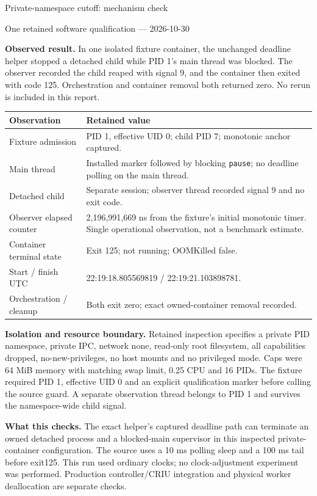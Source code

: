 \documentclass[11pt]{article}
\begin{document}
{\LARGE Private-namespace cutoff: mechanism check}\par
{\large One retained software qualification --- 2026-10-30}\par
\textbf{Observed result.} In one isolated fixture container, the unchanged deadline helper stopped a detached child while PID 1's main thread was blocked. The observer recorded the child reaped with signal 9, and the container then exited with code 125. Orchestration and container removal both returned zero. No rerun is included in this report.

\begin{tabularx}{\textwidth}{@{}p{}X@{}}\toprule
Observation & Retained value\\\midrule
Fixture admission & PID 1, effective UID 0; child PID 7; monotonic anchor captured.\\
Main thread & Installed marker followed by blocking \texttt{pause}; no deadline polling on the main thread.\\
Detached child & Separate session; observer thread recorded signal 9 and no exit code.\\
Observer elapsed counter & 2,196,991,669 ns from the fixture's initial monotonic timer. Single operational observation, not a benchmark estimate.\\
Container terminal state & Exit 125; not running; OOMKilled false.\\
Start / finish UTC & 22:19:18.805569819 / 22:19:21.103898781.\\
Orchestration / cleanup & Both exit zero; exact owned-container removal recorded.\\\bottomrule
\end{tabularx}

\textbf{Isolation and resource boundary.} Retained inspection specifies a private PID namespace, private IPC, network none, read-only root filesystem, all capabilities dropped, no-new-privileges, no host mounts and no privileged mode. Caps were 64 MiB memory with matching swap limit, 0.25 CPU and 16 PIDs. The fixture required PID 1, effective UID 0 and an explicit qualification marker before calling the source guard. A separate observation thread belongs to PID 1 and survives the namespace-wide child signal.

\textbf{What this checks.} The exact helper's captured deadline path can terminate an owned detached process and a blocked-main supervisor in this inspected private-container configuration. The source uses a 10 ms polling sleep and a 100 ms tail before exit125. This run used ordinary clocks; no clock-adjustment experiment was performed. Production controller/CRIU integration and physical worker deallocation are separate checks.
\end{document}
